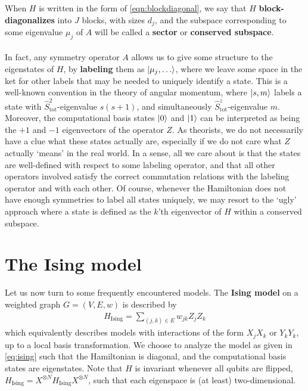 When $H$ is written in the form of \cref{eqn:blockdiagonal}, we say that $H$ \textbf{block-diagonalizes} into $J$ blocks, with sizes $d_j$, and the subspace corresponding to some eigenvalue $\mu_j$ of $A$ will be called a \textbf{sector} or \textbf{conserved subspace}.

%



\paragraph{}
In fact, any symmetry operator $A$ allows us to give some structure to the eigenstates of $H$, by \textbf{labeling} them as $\lvert \mu_j , \ldots \rangle$, where we leave some space in the ket for other labels that may be needed to uniquely identify a state. This is a well-known convention in the theory of angular momentum, where $\lvert s, m \rangle$ labels a state with $\hat{S}_\text{tot}^2$-eigenvalue $s(s+1)$, and simultaneously $\hat{S}_\text{tot}^z$-eigenvalue $m$. Moreover, the computational basis states $\lvert0\rangle$ and $\lvert1\rangle$ can be interpreted as being the $+1$ and $-1$ eigenvectors of the operator $Z$. As theorists, we do not necessarily have a clue what these states actually are, especially if we do not care what $Z$ actually `means' in the real world. In a sense, all we care about is that the states are well-defined with respect to some labeling operator, and that all other operators involved satisfy the correct commutation relations with the labeling operator and with each other. Of course, whenever the Hamiltonian does not have enough symmetries to label all states uniquely, we may resort to the `ugly' approach where a state is defined as the $k$'th eigenvector of $H$ within a conserved subspace. 




%
%
%
%
%
%
%
%
%


%
%




%


\section{The Ising model}
\label{sec:Ising}
Let us now turn to some frequently encountered models. The \textbf{Ising model} on a weighted graph $G = (V,E,w)$ is described by 
\begin{align}
H_\text{Ising} = \sum_{(j,k) \in E} w_{jk} Z_j Z_k %
\label{eq:ising}
\end{align}
which equivalently describes models with interactions of the form $X_j X_k$ or $Y_k Y_k$, up to a local basis transformation. We choose to analyze the model as given in \cref{eq:ising} such that the Hamiltonian is diagonal, and the computational basis states are eigenstates. Note that $H$ is invariant whenever all qubits are flipped, $H_\text{Ising} = X^{\otimes N} H_\text{Ising} X^{\otimes N}$, such that each eigenspace is (at least) two-dimensional.

